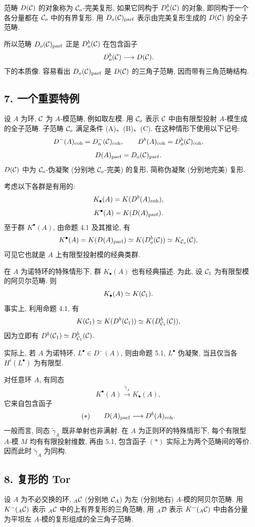 范畴 $D(\mathcal C)$ 的对象称为 $\mathcal C_o$-完美复形, 如果它同构于 $D_o^b(\mathcal C)$ 的对象, 即同构于一个各分量都在 $\mathcal C_o$ 中的有界复形. 用 $D_o(\mathcal C)_{\mathrm{parf}}$ 表示由完美复形生成的 $D(\mathcal C)$ 的全子范畴.

所以范畴 $D_o(\mathcal C)_{\mathrm{parf}}$ 正是 $D_o^b(\mathcal C)$ 在包含函子
\[
D_o^b(\mathcal C)\longrightarrow D(\mathcal C).
\]
下的本质像. 容易看出 $D_o(\mathcal C)_{\mathrm{parf}}$ 是 $D(\mathcal C)$ 的三角子范畴, 因而带有三角范畴结构.

\subsection*{7. 一个重要特例}

设 $A$ 为环, $\mathcal C$ 为 $A$-模范畴, 例如取左模. 用 $\mathcal C_o$ 表示 $\mathcal C$ 中由有限型投射 $A$-模生成的全子范畴. 子范畴 $\mathcal C_o$ 满足条件 (A)、(B)、(C). 在这种情形下使用以下记号:
\[
D^-(A)_{\mathrm{coh}}=D_o^-(\mathcal C)_{\mathrm{coh}},\qquad
D^b(A)_{\mathrm{coh}}=D_o^b(\mathcal C)_{\mathrm{coh}},
\]
\[
D(A)_{\mathrm{parf}}=D_o(\mathcal C)_{\mathrm{parf}}.
\]
$D(\mathcal C)$ 中为 $\mathcal C_o$-伪凝聚 (分别地 $\mathcal C_o$-完美) 的复形, 简称伪凝聚 (分别地完美) 复形.

考虑以下各群是有用的:
\[
K_\bullet(A)=K(D^b(A)_{\mathrm{coh}}),
\]
\[
K^\bullet(A)=K(D(A)_{\mathrm{parf}}).
\]
至于群 $K^\bullet(A)$, 由命题 4.1 及其推论, 有
\[
K^\bullet(A)=K(D(A)_{\mathrm{parf}})\simeq K(D_o^b(\mathcal C))\simeq K_{\mathcal C_o}(\mathcal C),
\]
可见它也就是 $A$ 上有限型投射模的经典类群.

在 $A$ 为诺特环的特殊情形下, 群 $K_\bullet(A)$ 也有经典描述. 为此, 设 $\mathcal C_1$ 为有限型模的阿贝尔范畴. 则
\[
K_\bullet(A)\simeq K(\mathcal C_1).
\]
事实上, 利用命题 4.1, 有
\[
K(\mathcal C_1)\simeq K(D^b(\mathcal C_1))\simeq K(D^b_{\mathcal C_1}(\mathcal C)),
\]
因为立即有 $D^b(\mathcal C_1)\simeq D^b_{\mathcal C_1}(\mathcal C)$.

实际上, 若 $A$ 为诺特环, $L^\bullet\in D^-(A)$, 则由命题 5.1, $L^\bullet$ 伪凝聚, 当且仅当各 $H^i(L^\bullet)$ 为有限型.

对任意环 $A$, 有同态
\[
K^\bullet(A)\xrightarrow{\widetilde\gamma_A}K_\bullet(A),
\]
它来自包含函子
\[
(*)\qquad D(A)_{\mathrm{parf}}\longrightarrow D^b(A)_{\mathrm{coh}}.
\]
一般而言, 同态 $\widetilde\gamma_A$ 既非单射也非满射. 在 $A$ 为正则环的特殊情形下, 每个有限型 $A$-模 $M$ 均有有限投射维数, 再由 5.1, 包含函子 $(*)$ 实际上为两个范畴间的等价. 因而此时 $\widetilde\gamma_A$ 为同构.

\subsection*{8. 复形的 Tor}

设 $A$ 为不必交换的环, ${}_A\mathcal C$ (分别地 $\mathcal C_A$) 为左 (分别地右) $A$-模的阿贝尔范畴. 用 $K^-({}_A\mathcal C)$ 表示 ${}_A\mathcal C$ 中的上有界复形的三角范畴, 用 ${}_A\mathcal D$ 表示 $K^-({}_A\mathcal C)$ 中由各分量为平坦左 $A$-模的复形组成的全三角子范畴.

